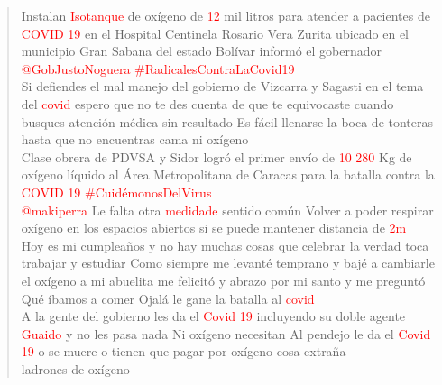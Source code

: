 \begin{quote}
	\textcolor{red}{}Instalan \textcolor{red}{Isotanque} de oxígeno de \textcolor{red}{12} mil litros para atender a pacientes de \textcolor{red}{COVID} \textcolor{red}{19} en el Hospital Centinela Rosario Vera Zurita ubicado en el municipio Gran Sabana del estado Bolívar informó el gobernador \textcolor{red}{@GobJustoNoguera} \textcolor{red}{\#RadicalesContraLaCovid19} \textcolor{red}{} 
	\vspace{12pt} \\
	\textcolor{red}{}Si defiendes el mal manejo del gobierno de Vizcarra y Sagasti en el tema del \textcolor{red}{covid} espero que no te des cuenta de que te equivocaste cuando busques atención médica sin resultado Es fácil llenarse la boca de tonteras hasta que no encuentras cama ni oxígeno \textcolor{red}{} 
	\vspace{12pt} \\
	\textcolor{red}{}Clase obrera de PDVSA y Sidor logró el primer envío de \textcolor{red}{10} \textcolor{red}{280} Kg de oxígeno líquido al Área Metropolitana de Caracas para la batalla contra la \textcolor{red}{COVID} \textcolor{red}{19} \textcolor{red}{\#CuidémonosDelVirus} \textcolor{red}{} 
	\vspace{12pt} \\
	\textcolor{red}{}\textcolor{red}{@makiperra} Le falta otra \textcolor{red}{medidade} sentido común Volver a poder respirar oxígeno en los espacios abiertos si se puede mantener distancia de \textcolor{red}{2m} \textcolor{red}{} 
	\vspace{12pt} \\
	\textcolor{red}{}Hoy es mi cumpleaños y no hay muchas cosas que celebrar la verdad toca trabajar y estudiar Como siempre me levanté temprano y bajé a cambiarle el oxígeno a mi abuelita me felicitó y abrazo por mi santo y me preguntó Qué íbamos a comer Ojalá le gane la batalla al \textcolor{red}{covid} \textcolor{red}{} 
	\vspace{12pt} \\
	\textcolor{red}{}A la gente del gobierno les da el \textcolor{red}{Covid} \textcolor{red}{19} incluyendo su doble agente \textcolor{red}{Guaido} y no les pasa nada Ni oxígeno necesitan Al pendejo le da el \textcolor{red}{Covid} \textcolor{red}{19} o se muere o tienen que pagar por oxígeno cosa extraña \textcolor{red}{} 
	\vspace{12pt} \\
	\textcolor{red}{}ladrones de oxígeno \textcolor{red}{} 
	\vspace{12pt} \\

\end{quote}
